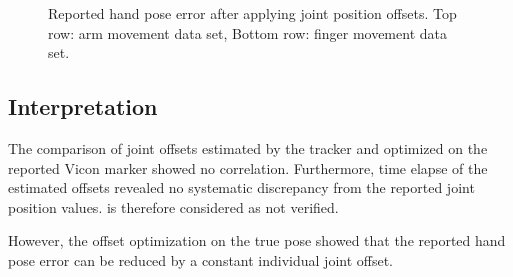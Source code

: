 \begin{figure}
\centering
{}


\caption{Reported hand pose error after applying joint position offsets. Top row: arm movement data set, Bottom row: finger movement data set.}
\label{fig:corrected_hand_pose}
\end{figure}


\subsection{Interpretation}

The comparison of joint offsets estimated by the tracker and optimized on the reported Vicon marker showed no correlation. Furthermore, time elapse of the estimated offsets revealed no systematic discrepancy from the reported joint position values.  is therefore considered as not verified.

However, the offset optimization on the true pose showed that the reported hand pose error can be reduced by a constant individual joint offset.
